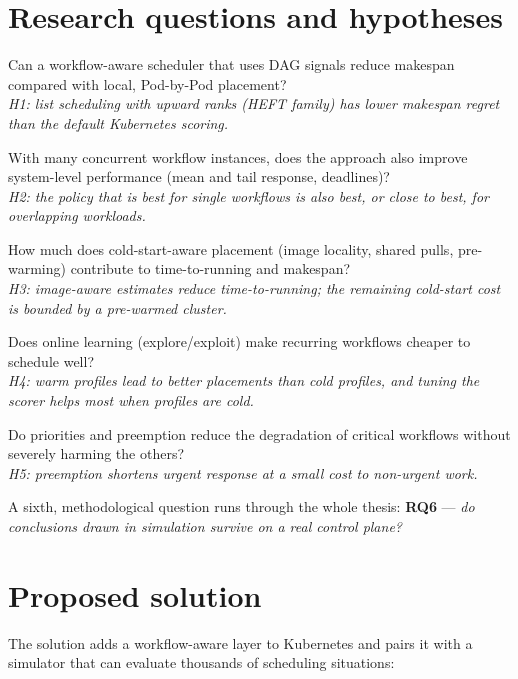 \documentclass[12pt,a4paper]{report}
\begin{document}
\section{Research questions and hypotheses}
\label{sec:rqs}

\begin{description}[leftmargin=1.2cm,style=nextline]
\item[RQ1] Can a workflow-aware scheduler that uses DAG signals reduce
      makespan compared with local, Pod-by-Pod placement?\\
      \emph{H1: list scheduling with upward ranks (HEFT family) has lower
      makespan regret than the default Kubernetes scoring.}
\item[RQ2] With many concurrent workflow instances, does the approach also
      improve system-level performance (mean and tail response,
      deadlines)?\\
      \emph{H2: the policy that is best for single workflows is also best,
      or close to best, for overlapping workloads.}
\item[RQ3] How much does cold-start-aware placement (image locality,
      shared pulls, pre-warming) contribute to time-to-running and
      makespan?\\
      \emph{H3: image-aware estimates reduce time-to-running; the
      remaining cold-start cost is bounded by a pre-warmed cluster.}
\item[RQ4] Does online learning (explore/exploit) make recurring workflows
      cheaper to schedule well?\\
      \emph{H4: warm profiles lead to better placements than cold
      profiles, and tuning the scorer helps most when profiles are cold.}
\item[RQ5] Do priorities and preemption reduce the degradation of critical
      workflows without severely harming the others?\\
      \emph{H5: preemption shortens urgent response at a small cost to
      non-urgent work.}
\end{description}

A sixth, methodological question runs through the whole thesis:
\textbf{RQ6} --- \emph{do conclusions drawn in simulation survive on a
real control plane?}

\section{Proposed solution}

The solution adds a workflow-aware layer to Kubernetes and pairs it with
a simulator that can evaluate thousands of scheduling situations:
\end{document}

